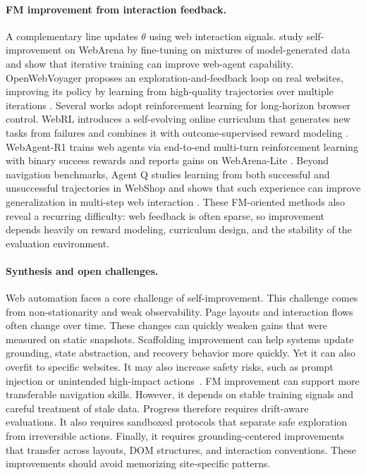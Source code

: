 \paragraph{FM improvement from interaction feedback.}
A complementary line updates $\theta$ using web interaction signals. \cite{patel2024largelanguagemodelsselfimprove} study self-improvement on WebArena by fine-tuning on mixtures of model-generated data and show that iterative training can improve web-agent capability. OpenWebVoyager proposes an exploration-and-feedback loop on real websites, improving its policy by learning from high-quality trajectories over multiple iterations \citep{he2024openwebvoyagerbuildingmultimodalweb}. Several works adopt reinforcement learning for long-horizon browser control. WebRL introduces a self-evolving online curriculum that generates new tasks from failures and combines it with outcome-supervised reward modeling \citep{qi2025webrl}. WebAgent-R1 trains web agents via end-to-end multi-turn reinforcement learning with binary success rewards and reports gains on WebArena-Lite \citep{wei2025webagentr1trainingwebagents}. Beyond navigation benchmarks, Agent Q studies learning from both successful and unsuccessful trajectories in WebShop and shows that such experience can improve generalization in multi-step web interaction \citep{putta2024agentqadvancedreasoning}. These FM-oriented methods also reveal a recurring difficulty: web feedback is often sparse, so improvement depends heavily on reward modeling, curriculum design, and the stability of the evaluation environment.

\paragraph{Synthesis and open challenges.}
Web automation faces a core challenge of self-improvement. This challenge comes from non-stationarity and weak observability. Page layouts and interaction flows often change over time. These changes can quickly weaken gains that were measured on static snapshots. Scaffolding improvement can help systems update grounding, state abstraction, and recovery behavior more quickly. Yet it can also overfit to specific websites. It may also increase safety risks, such as prompt injection or unintended high-impact actions~\citep{chen2026much}. FM improvement can support more transferable navigation skills. However, it depends on stable training signals and careful treatment of stale data. Progress therefore requires drift-aware evaluations. It also requires sandboxed protocols that separate safe exploration from irreversible actions. Finally, it requires grounding-centered improvements that transfer across layouts, DOM structures, and interaction conventions. These improvements should avoid memorizing site-specific patterns.



